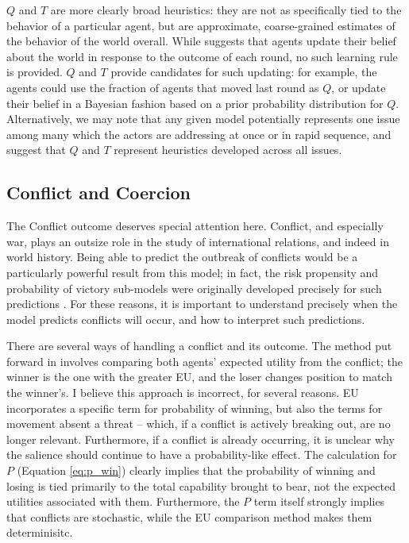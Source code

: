 $Q$ and $T$ are more clearly broad heuristics: they are not as specifically tied to the behavior of a particular agent, but are approximate, coarse-grained estimates of the behavior of the world overall. While \citet{bdm_2002} suggests that agents update their belief about the world in response to the outcome of each round, no such learning rule is provided. $Q$ and $T$ provide candidates for such updating: for example, the agents could use the fraction of agents that moved last round as $Q$, or update their belief in a Bayesian fashion based on a prior probability distribution for $Q$. Alternatively, we may note that any given model potentially represents one issue among many which the actors are addressing at once or in rapid sequence, and suggest that $Q$ and $T$ represent heuristics developed across all issues.

\subsection{Conflict and Coercion} \label{conflict_coercion}

The Conflict outcome deserves special attention here. Conflict, and especially war, plays an outsize role in the study of international relations, and indeed in world history. Being able to predict the outbreak of conflicts would be a particularly powerful result from this model; in fact, the risk propensity and probability of victory sub-models were originally developed precisely for such predictions \citep{bdm_1985}. For these reasons, it is important to understand precisely when the model predicts conflicts will occur, and how to interpret such predictions.

There are several ways of handling a conflict and its outcome. The method put forward in \citet{scholz_2011} involves comparing both agents' expected utility from the conflict; the winner is the one with the greater EU, and the loser changes position to match the winner's. I believe this approach is incorrect, for several reasons. EU incorporates a specific term for probability of winning, but also the terms for movement absent a threat -- which, if a conflict is actively breaking out, are no longer relevant. Furthermore, if a conflict is already occurring, it is unclear why the salience should continue to have a probability-like effect. The calculation for $P$ (Equation \ref{eq:p_win}) clearly implies that the probability of winning and losing is tied primarily to the total capability brought to bear, not the expected utilities associated with them. Furthermore, the $P$ term itself strongly implies that conflicts are stochastic, while the EU comparison method makes them determinisitc.


